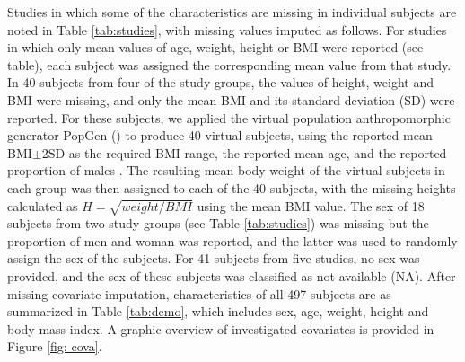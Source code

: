 \documentclass[utf8]{frontiersSCNS} %
\begin{document}
Studies in which some of the characteristics are missing in individual subjects are noted in Table \ref{tab:studies}, with missing values imputed as follows. For studies in which only mean values of age, weight, height or BMI were reported (see table), each subject was assigned the corresponding mean value from that study. In 40 subjects from four of the study groups, the values of height, weight and BMI were missing, and only the mean BMI and its standard deviation (SD) were reported. For these subjects, we applied the virtual population anthropomorphic generator PopGen (\cite{McNally2015}) to produce 40 virtual subjects, using the reported mean BMI$\pm$2SD as the required BMI range, the reported mean age, and the reported proportion of males \citep{1998_AGING_Ahren}. The resulting mean body weight of the virtual subjects in each group was then assigned to each of the 40 subjects, with the missing heights calculated as $H=\sqrt{weight/BMI}$ using the mean BMI value. The sex of 18 subjects from two study groups (see Table \ref{tab:studies}) was missing but the proportion of men and woman was reported, and the latter was used to randomly assign the sex of the subjects. For 41 subjects from five studies, no sex was provided, and the sex of these subjects was classified as not available (NA). After missing covariate imputation, characteristics of all 497 subjects are as summarized in Table \ref{tab:demo}, which includes sex, age, weight, height and body mass index. A graphic overview of investigated covariates is provided in Figure \ref{fig: cova}. 

\vskip 0.7cm
\end{document}
